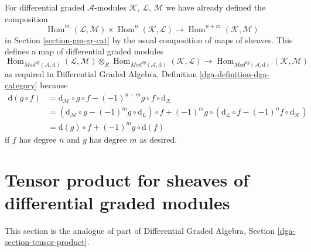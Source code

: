 \documentclass{stacks-project}
\theoremstyle{plain}
\theoremstyle{definition}
\theoremstyle{remark}
\numberwithin{equation}{subsection}
\def\Hom{\mathop{\mathrm{Hom}}\nolimits}
\begin{document}
\medskip\noindent
For differential graded $\mathcal{A}$-modules
$\mathcal{K}$, $\mathcal{L}$, $\mathcal{M}$
we have already defined the composition
$$
\Hom^m(\mathcal{L}, \mathcal{M}) \times
\Hom^n(\mathcal{K}, \mathcal{L}) \longrightarrow
\Hom^{n + m}(\mathcal{K}, \mathcal{M})
$$
in Section \ref{section-gm-gr-cat} by the usual composition
of maps of sheaves. This defines a map of differential graded modules
$$
\Hom_{\textit{Mod}^{dg}(\mathcal{A}, \text{d})}(\mathcal{L}, \mathcal{M})
\otimes_R
\Hom_{\textit{Mod}^{dg}(\mathcal{A}, \text{d})}(\mathcal{K}, \mathcal{L})
\longrightarrow
\Hom_{\textit{Mod}^{dg}(\mathcal{A}, \text{d})}(\mathcal{K}, \mathcal{M})
$$
as required in
Differential Graded Algebra, Definition \ref{dga-definition-dga-category}
because
\begin{align*}
\text{d}(g \circ f) & =
\text{d}_\mathcal{M} \circ g \circ f
- (-1)^{n + m} g \circ f \circ \text{d}_\mathcal{K} \\
& =
\left(\text{d}_\mathcal{M} \circ g - (-1)^m g \circ \text{d}_L\right) \circ f
+ (-1)^m g \circ \left(\text{d}_\mathcal{L} \circ f
- (-1)^n f \circ \text{d}_\mathcal{K}\right) \\
& =
\text{d}(g) \circ f + (-1)^m g \circ \text{d}(f)
\end{align*}
if $f$ has degree $n$ and $g$ has degree $m$ as desired.






\section{Tensor product for sheaves of differential graded modules}
\label{section-tensor-product-dg}

\noindent
This section is the analogue of part of
Differential Graded Algebra, Section \ref{dga-section-tensor-product}.
\end{document}
